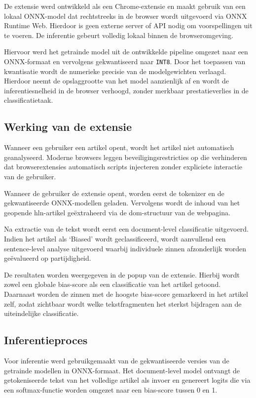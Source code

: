 De extensie werd ontwikkeld als een Chrome-extensie en maakt gebruik van een lokaal ONNX-model dat rechtstreeks in de browser wordt uitgevoerd via ONNX Runtime Web. Hierdoor is geen externe server of API nodig om voorspellingen uit te voeren. De inferentie gebeurt volledig lokaal binnen de browseromgeving.

Hiervoor werd het getrainde model uit de ontwikkelde pipeline omgezet naar een ONNX-formaat en vervolgens gekwantiseerd naar \texttt{INT8}. Door het toepassen van kwantisatie wordt de numerieke precisie van de modelgewichten verlaagd. Hierdoor neemt de opslaggrootte van het model aanzienlijk af en wordt de inferentiesnelheid in de browser verhoogd, zonder merkbaar prestatieverlies in de classificatietaak.

\subsection{Werking van de extensie}

Wanneer een gebruiker een artikel opent, wordt het artikel niet automatisch geanalyseerd. Moderne browsers leggen beveiligingsrestricties op die verhinderen dat browserextensies automatisch scripts injecteren zonder expliciete interactie van de gebruiker.

Wanneer de gebruiker de extensie opent, worden eerst de tokenizer en de gekwantiseerde ONNX-modellen geladen. Vervolgens wordt de inhoud van het geopende \gls{hln}-artikel geëxtraheerd via de \gls{dom}-structuur van de webpagina.

Na extractie van de tekst wordt eerst een document-level classificatie uitgevoerd. Indien het artikel als `Biased' wordt geclassificeerd, wordt aanvullend een sentence-level analyse uitgevoerd waarbij individuele zinnen afzonderlijk worden geëvalueerd op partijdigheid.

De resultaten worden weergegeven in de popup van de extensie. Hierbij wordt zowel een globale bias-score als een classificatie van het artikel getoond. Daarnaast worden de zinnen met de hoogste bias-score gemarkeerd in het artikel zelf, zodat zichtbaar wordt welke tekstfragmenten het sterkst bijdragen aan de uiteindelijke classificatie.

\subsection{Inferentieproces}

Voor inferentie werd gebruikgemaakt van de gekwantiseerde versies van de getrainde modellen in ONNX-formaat. Het document-level model ontvangt de getokeniseerde tekst van het volledige artikel als invoer en genereert logits die via een softmax-functie worden omgezet naar een bias-score tussen 0 en 1.

